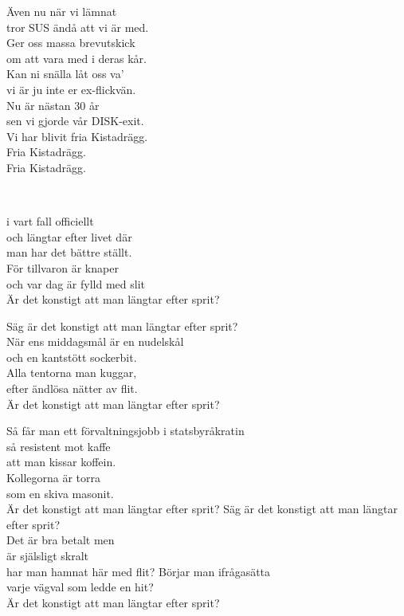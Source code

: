 Även nu när vi lämnat \\ 
tror SUS ändå att vi är med. \\ 
Ger oss massa brevutskick \\ 
om att vara med i deras kår. \\ 
Kan ni snälla låt oss va'  \\ 
vi är ju inte er ex-flickvän. \\ 
Nu är nästan 30 år \\ 
sen vi gjorde vår DISK-exit. \\
\leftrepeat Vi har blivit fria Kistadrägg. \\ 
Fria Kistadrägg. \\ 
Fria Kistadrägg. \rightrepeat


\newpage 


 \\       
\author{Text: Jacke, Quiz och Yoshi}

 i vart fall officiellt \\
och längtar efter livet där \\
man har det bättre ställt. \\
För tillvaron är knaper  \\
och var dag är fylld med slit \\
Är det konstigt att man längtar efter sprit?

Säg är det konstigt att man längtar efter sprit? \\
När ens middagsmål är en nudelskål \\
och en kantstött sockerbit. \\
Alla tentorna man kuggar, \\
efter ändlösa nätter av flit. \\
Är det konstigt att man längtar efter sprit?

Så får man ett förvaltningsjobb i statsbyråkratin \\
så resistent mot kaffe \\
att man kissar koffein. \\
Kollegorna är torra \\
som en skiva masonit. \\
Är det konstigt att man längtar efter sprit?
\newpage
Säg är det konstigt att man längtar efter sprit? \\
Det är bra betalt men \\
är själsligt skralt \\
har man hamnat här med flit?
Börjar man ifrågasätta \\
varje vägval som ledde en hit? \\
Är det konstigt att man längtar efter sprit?

